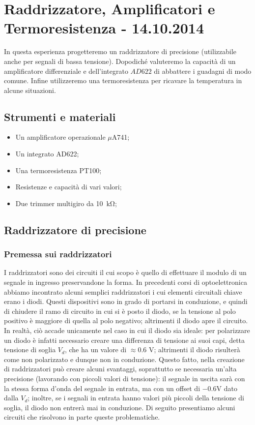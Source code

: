 \section{Raddrizzatore, Amplificatori e Termoresistenza - 14.10.2014}

In questa esperienza progetteremo un raddrizzatore di precisione (utilizzabile anche per segnali di bassa tensione). Dopodiché valuteremo la capacità di un amplificatore differenziale e dell'integrato $AD622$ di abbattere i guadagni di modo comune. Infine utilizzeremo una termoresistenza per ricavare la temperatura in alcune situazioni.

\subsection*{Strumenti e materiali}

\begin{itemize} [noitemsep]
\item Un amplificatore operazionale $\mu$A741;
\item Un integrato AD622;
\item Una termoresistenza PT100;
\item Resistenze e capacità di vari valori;
\item Due trimmer multigiro da \SI{10}{\kilo\ohm};
\end{itemize}

\subsection{Raddrizzatore di precisione}

\subsubsection*{Premessa sui raddrizzatori}

I raddrizzatori sono dei circuiti il cui scopo è quello di effettuare il modulo di un segnale in ingresso preservandone la forma. In precedenti corsi di optoelettronica abbiamo incontrato alcuni semplici raddrizzatori i cui elementi circuitali chiave erano i diodi. Questi dispositivi sono in grado di portarsi in conduzione, e quindi di chiudere il ramo di circuito in cui si è posto il diodo, se la tensione al polo positivo è maggiore di quella al polo negativo; altrimenti il diodo apre il circuito. In realtà, ciò accade unicamente nel caso in cui il diodo sia ideale: per polarizzare un diodo è infatti necessario creare una differenza di tensione ai suoi capi, detta tensione di soglia $V_d$, che ha un valore di $\approx 0.6$ \si{\volt}; altrimenti il diodo risulterà come non polarizzato e dunque non in conduzione. Questo fatto, nella creazione di raddrizzatori può creare alcuni svantaggi, soprattutto se necessaria un'alta precisione (lavorando con piccoli valori di tensione): il segnale in uscita sarà con la stessa forma d'onda del segnale in entrata, ma con un offset di $-0.6$\si{\volt} dato dalla $V_d$; inoltre, se i segnali in entrata hanno valori più piccoli della tensione di soglia, il diodo non entrerà mai in conduzione. Di seguito presentiamo alcuni circuiti che risolvono in parte queste problematiche.

